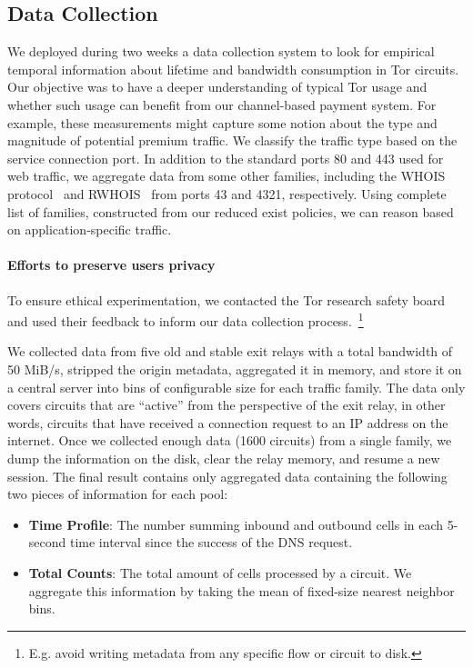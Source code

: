 \subsection{Data Collection}
\label{subsec:datacollection}

We deployed during two weeks a data collection system to look for empirical temporal information about lifetime and bandwidth consumption in Tor circuits.
Our objective was to have a deeper understanding of typical Tor usage and whether such usage can benefit from our channel-based payment system.
For example, these measurements might capture some notion about the type and magnitude of potential premium traffic.
We classify the traffic type based on the service connection port.
In addition to the standard ports 80 and 443 used for web traffic, we aggregate data from some other families, including the WHOIS protocol~\cite{daigle2004whois} and RWHOIS~\cite{williamson1994referral} from ports 43 and 4321, respectively.
Using complete list of families, constructed from our reduced exist policies, we can reason based on application-specific traffic.

\paragraph*{Efforts to preserve users privacy}

To ensure ethical experimentation, we contacted the Tor research safety board~\cite{torsafety} and used their feedback to inform our data collection process.~\footnote{E.g.
avoid writing metadata from any specific flow or circuit to disk.}

We collected data from five old and stable exit relays with a total bandwidth of 50 MiB/s, stripped the origin metadata, aggregated it in memory, and store it on a central server into bins of configurable size for each traffic family.
The data only covers circuits that are ``active'' from the perspective of the exit relay, in other words, circuits that have received a connection request to an IP address on the internet.
Once we collected enough data (1600 circuits) from a single family, we dump the information on the disk, clear the relay memory, and resume a new session.
The final result contains only aggregated data containing the following two pieces of information for each pool:

\begin{itemize}
\item \textbf{Time Profile}: The number summing inbound and outbound cells in each 5-second time interval since the success of the DNS request.
\item \textbf{Total Counts}: The total amount of cells processed by a circuit.
  We aggregate this information by taking the mean of fixed-size nearest neighbor bins.
\end{itemize}

